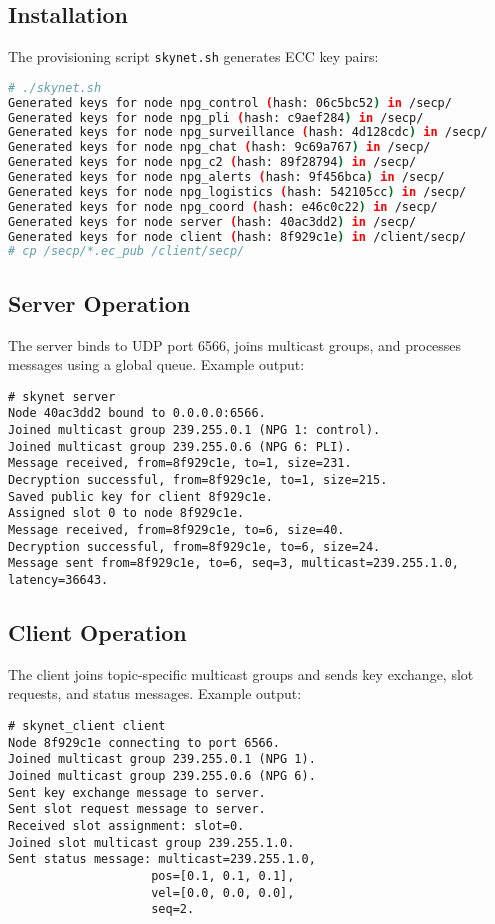 \documentclass{article}
\begin{document}
\subsection{Installation}
The provisioning script \texttt{skynet.sh} generates ECC key pairs:
\begin{lstlisting}[language=bash]
# ./skynet.sh
Generated keys for node npg_control (hash: 06c5bc52) in /secp/
Generated keys for node npg_pli (hash: c9aef284) in /secp/
Generated keys for node npg_surveillance (hash: 4d128cdc) in /secp/
Generated keys for node npg_chat (hash: 9c69a767) in /secp/
Generated keys for node npg_c2 (hash: 89f28794) in /secp/
Generated keys for node npg_alerts (hash: 9f456bca) in /secp/
Generated keys for node npg_logistics (hash: 542105cc) in /secp/
Generated keys for node npg_coord (hash: e46c0c22) in /secp/
Generated keys for node server (hash: 40ac3dd2) in /secp/
Generated keys for node client (hash: 8f929c1e) in /client/secp/
# cp /secp/*.ec_pub /client/secp/
\end{lstlisting}

\subsection{Server Operation}
The server binds to UDP port 6566, joins multicast groups, and processes messages using a global
queue. Example output:
\begin{lstlisting}
# skynet server
Node 40ac3dd2 bound to 0.0.0.0:6566.
Joined multicast group 239.255.0.1 (NPG 1: control).
Joined multicast group 239.255.0.6 (NPG 6: PLI).
Message received, from=8f929c1e, to=1, size=231.
Decryption successful, from=8f929c1e, to=1, size=215.
Saved public key for client 8f929c1e.
Assigned slot 0 to node 8f929c1e.
Message received, from=8f929c1e, to=6, size=40.
Decryption successful, from=8f929c1e, to=6, size=24.
Message sent from=8f929c1e, to=6, seq=3, multicast=239.255.1.0, latency=36643.
\end{lstlisting}

\subsection{Client Operation}
The client joins topic-specific multicast groups and sends key exchange, slot requests, and status
messages. Example output:
\begin{lstlisting}
# skynet_client client
Node 8f929c1e connecting to port 6566.
Joined multicast group 239.255.0.1 (NPG 1).
Joined multicast group 239.255.0.6 (NPG 6).
Sent key exchange message to server.
Sent slot request message to server.
Received slot assignment: slot=0.
Joined slot multicast group 239.255.1.0.
Sent status message: multicast=239.255.1.0,
                    pos=[0.1, 0.1, 0.1],
                    vel=[0.0, 0.0, 0.0],
                    seq=2.
\end{lstlisting}
\end{document}

